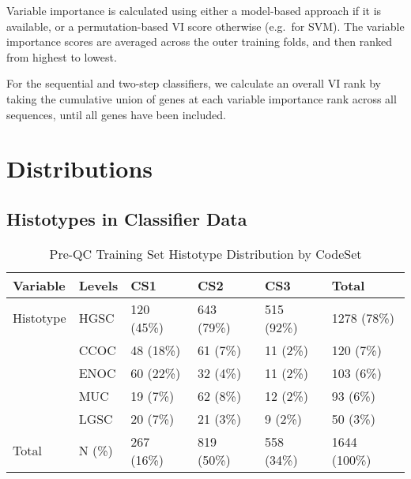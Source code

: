 \documentclass[
]{report}
\begin{document}
Variable importance is calculated using either a model-based approach if it is available, or a permutation-based VI score otherwise (e.g.~for SVM). The variable importance scores are averaged across the outer training folds, and then ranked from highest to lowest.

For the sequential and two-step classifiers, we calculate an overall VI rank by taking the cumulative union of genes at each variable importance rank across all sequences, until all genes have been included.

\hypertarget{distributions}{%
\chapter{Distributions}\label{distributions}}

\hypertarget{histotypes-in-classifier-data}{%
\section{Histotypes in Classifier Data}\label{histotypes-in-classifier-data}}

\begin{table}

\caption{\label{tab:preqc-hist-codeset}Pre-QC Training Set Histotype Distribution by CodeSet}
\centering
\begin{tabular}[t]{l|l|l|l|l|l}
\hline
Variable & Levels & CS1 & CS2 & CS3 & Total\\
\hline
Histotype & HGSC & 120 (45\%) & 643 (79\%) & 515 (92\%) & 1278 (78\%)\\
\hline
 & CCOC & 48 (18\%) & 61 (7\%) & 11 (2\%) & 120 (7\%)\\
\hline
 & ENOC & 60 (22\%) & 32 (4\%) & 11 (2\%) & 103 (6\%)\\
\hline
 & MUC & 19 (7\%) & 62 (8\%) & 12 (2\%) & 93 (6\%)\\
\hline
 & LGSC & 20 (7\%) & 21 (3\%) & 9 (2\%) & 50 (3\%)\\
\hline
Total & N (\%) & 267 (16\%) & 819 (50\%) & 558 (34\%) & 1644 (100\%)\\
\hline
\end{tabular}
\end{table}
\end{document}

